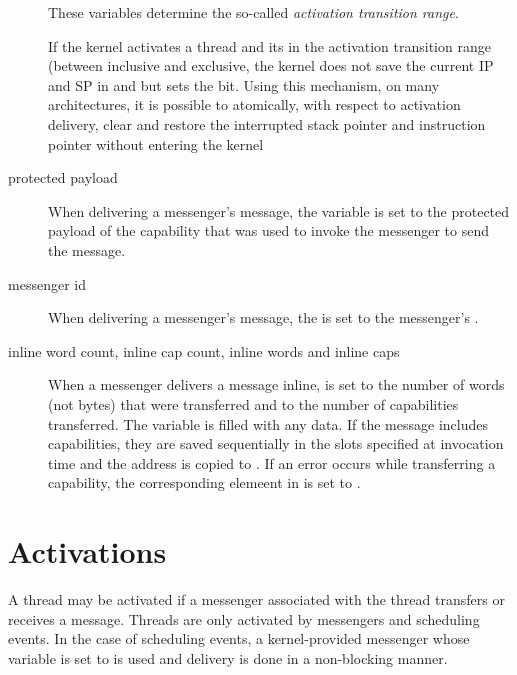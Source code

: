 \begin{description}
These variables determine the so-called \emph{activation transition
  range}.

If the kernel activates a thread and its in the activation transition
range (between  inclusive and
 exclusive, the kernel does not save the
current IP and SP in  and  but sets the
 bit.  Using this mechanism, on many
architectures, it is possible to atomically, with respect to
activation delivery, clear  and restore the
interrupted stack pointer and instruction pointer without entering the
kernel

\item[protected payload]

When delivering a messenger's message, the 
variable is set to the protected payload of the capability that was
used to invoke the messenger to send the message.

\item[messenger id]

When delivering a messenger's message, the  is set
to the messenger's .

\item[inline word count, inline cap count, inline words \textmd{and}
  inline caps]

When a messenger delivers a message inline,  is
set to the number of words (not bytes) that were transferred and
 to the number of capabilities transferred.  The
 variable is filled with any data.  If the message
includes capabilities, they are saved sequentially in the slots
specified at invocation time and the address is copied to .  If an error occurs while transferring a capability,
the corresponding elemeent in  is set to
.

\end{description}

\section{Activations}

A thread may be activated if a messenger associated with the thread
transfers or receives a message.  Threads are only activated by
messengers and scheduling events.  In the case of scheduling events, a
kernel-provided messenger whose  variable is set to
 is used and delivery is done in a non-blocking manner.

